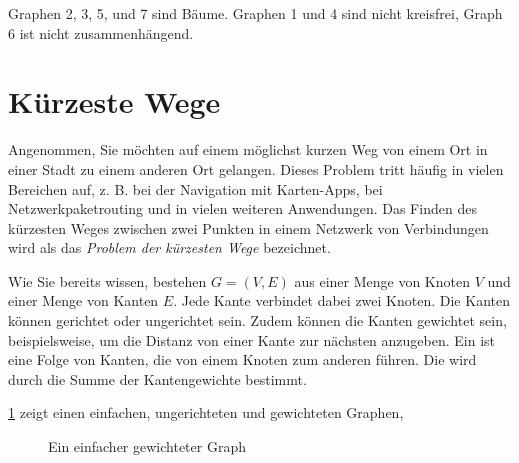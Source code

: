 \begin{myexercise}
\begin{enumerate*}
	
\item 	{}
	\end{enumerate*}
	\begin{myanswer}
Graphen 2, 3, 5, und 7 sind Bäume. Graphen 1 und 4 sind nicht kreisfrei, Graph 6 ist nicht zusammenhängend.
	\end{myanswer}
\end{myexercise}

\section{Kürzeste Wege}
Angenommen, Sie möchten auf einem möglichst kurzen Weg von einem Ort in einer Stadt zu einem anderen Ort gelangen. Dieses Problem tritt häufig in vielen Bereichen auf, z. B. bei der Navigation mit Karten-Apps, bei Netzwerkpaketrouting und in vielen weiteren Anwendungen. Das Finden des kürzesten Weges zwischen zwei Punkten in einem Netzwerk von Verbindungen wird als das \textit{Problem der kürzesten Wege} bezeichnet.

Wie Sie bereits wissen, bestehen  $G = (V, E)$ aus einer Menge von Knoten $V$ und einer Menge von Kanten $E$. Jede Kante verbindet dabei zwei Knoten. Die Kanten können gerichtet oder ungerichtet sein. Zudem können die Kanten gewichtet sein, beispielsweise, um die Distanz von einer Kante zur nächsten anzugeben. Ein  ist eine Folge von Kanten, die von einem Knoten zum anderen führen. Die  wird durch die Summe der Kantengewichte bestimmt.

\cref{fig:simpleGraph} zeigt einen einfachen, ungerichteten und gewichteten Graphen,

\begin{figure}[h!]
    \centering
    \caption{Ein einfacher gewichteter Graph}
    \label{fig:simpleGraph}
\end{figure}

